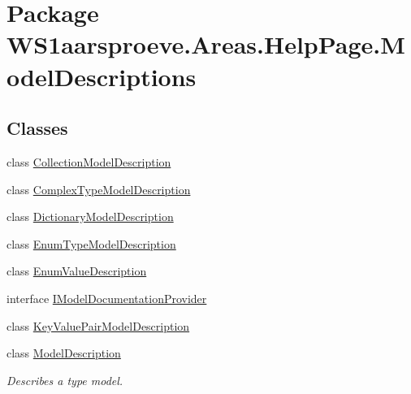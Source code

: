 \hypertarget{namespace_w_s1aarsproeve_1_1_areas_1_1_help_page_1_1_model_descriptions}{}\section{Package W\+S1aarsproeve.\+Areas.\+Help\+Page.\+Model\+Descriptions}
\label{namespace_w_s1aarsproeve_1_1_areas_1_1_help_page_1_1_model_descriptions}
\subsection*{Classes}
\begin{DoxyCompactItemize}
\item 
class \hyperlink{class_w_s1aarsproeve_1_1_areas_1_1_help_page_1_1_model_descriptions_1_1_collection_model_description}{Collection\+Model\+Description}
\item 
class \hyperlink{class_w_s1aarsproeve_1_1_areas_1_1_help_page_1_1_model_descriptions_1_1_complex_type_model_description}{Complex\+Type\+Model\+Description}
\item 
class \hyperlink{class_w_s1aarsproeve_1_1_areas_1_1_help_page_1_1_model_descriptions_1_1_dictionary_model_description}{Dictionary\+Model\+Description}
\item 
class \hyperlink{class_w_s1aarsproeve_1_1_areas_1_1_help_page_1_1_model_descriptions_1_1_enum_type_model_description}{Enum\+Type\+Model\+Description}
\item 
class \hyperlink{class_w_s1aarsproeve_1_1_areas_1_1_help_page_1_1_model_descriptions_1_1_enum_value_description}{Enum\+Value\+Description}
\item 
interface \hyperlink{interface_w_s1aarsproeve_1_1_areas_1_1_help_page_1_1_model_descriptions_1_1_i_model_documentation_provider}{I\+Model\+Documentation\+Provider}
\item 
class \hyperlink{class_w_s1aarsproeve_1_1_areas_1_1_help_page_1_1_model_descriptions_1_1_key_value_pair_model_description}{Key\+Value\+Pair\+Model\+Description}
\item 
class \hyperlink{class_w_s1aarsproeve_1_1_areas_1_1_help_page_1_1_model_descriptions_1_1_model_description}{Model\+Description}
\begin{DoxyCompactList}\small\item\em Describes a type model. \end{DoxyCompactList}\item 

\end{DoxyCompactItemize}
